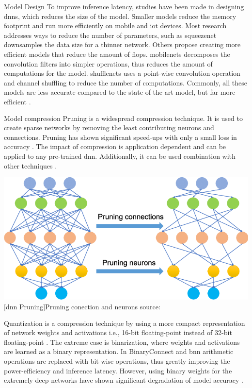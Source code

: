 \begin{enumdescript}
	\item[Model Design] To improve inference latency, studies have been made in designing \gls{dnn}s, which reduces the size of the model. Smaller models reduce the memory footprint and run more efficiently on mobile and \gls{iot} devices. Most research addresses ways to reduce the number of parameters, such as \gls{squeezenet} \cite{iandola_squeezenet:_2016} downsamples the data size for a thinner network. Others propose creating more efficient models that reduce the amount of \acrshort{flop}s. \gls{mobilenet}s \cite{howard_mobilenets:_2017,sandler_mobilenetv2:_2018} decomposes the convolution filters into simpler operations, thus reduces the amount of computations for the model. \gls{shufflenet}s \cite{zhang_shufflenet:_2017, ma_shufflenet_2018} uses a point-wise convolution operation and channel shuffling to reduce the number of computations. Commonly, all these models are less accurate compared to the state-of-the-art model, but far more efficient \cite{bianco_benchmark_2018}. 
		
	\item[Model compression] Pruning is a widespread compression technique. It is used to create sparse networks by removing the least contributing neurons and connections. Pruning has shown significant speed-ups with only a small loss in accuracy \cite{zhou_edge_2019}. The impact of compression is application dependent and can be applied to any pre-trained \gls{dnn}. Additionally, it can be used combination with other techniques \cite{cheng_survey_2017}.
	
	\begin{minipage}[t]{\linewidth}
		\centering
		\includegraphics[width=.4\linewidth]{figures/articles/Pruning-a-neural-network}
		[\gls{dnn} Pruning]{Pruning conection and neurons source:  \cite{chen_deep_2019}}
	\end{minipage}
	
	Quantization is a compression technique by using a more compact representation of network weights and activations i.e., 16-bit floating-point instead of 32-bit floating-point \cite{cheng_survey_2017}. The extreme case is binarization, where weights and activations are learned as a binary representation. In BinaryConnect \cite{courbariaux_binaryconnect:_2015} and \gls{bnn} \cite{courbariaux_binarized_2016} arithmetic operations are replaced with bit-wise operations, thus greatly improving the power-efficiency and inference latency. However, using binary weights for the extremely deep networks have shown significant degradation of model accuracy \cite{cheng_survey_2017}.
	

\end{enumdescript}
